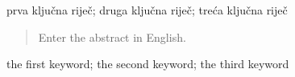 \documentclass[times, utf8, diplomskirad]{fer}
\begin{document}
\begin{kljucnerijeci}
  prva ključna riječ; druga ključna riječ; treća ključna riječ
\end{kljucnerijeci}


\begin{abstract}
  Enter the abstract in English.
  
  \blindtext 
\end{abstract}

\begin{keywords}
  the first keyword; the second keyword; the third keyword
\end{keywords}



\backmatter


\Blindtext
\end{document}
